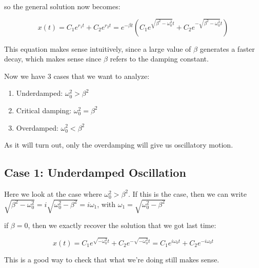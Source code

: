 so the general solution now becomes: 

\[ x(t) = C_1e^{r_1t} + C_2e^{r_2t} = e^{-\beta t} \left( C_1e^{\sqrt{\beta^2 - \omega_0^2} t } + C_2e^{-\sqrt{\beta^2 - \omega_0^2}t}\right)\]

This equation makes sense intuitively, since a large value of $\beta$ generates a faster decay, which makes sense since $\beta$ refers to the damping constant. 

Now we have 3 cases that we want to analyze: 

\begin{enumerate}[label = (\alph*)]
    \item Underdamped: $\omega_0^2 > \beta^2$ 
    \item Critical damping: $\omega_0^2 = \beta^2$
    \item Overdamped: $\omega_0^2 < \beta^2$
\end{enumerate}

As it will turn out, only the overdamping will give us oscillatory motion.

\subsection{Case 1: Underdamped Oscillation} 

Here we look at the case where $\omega_0^2 > \beta^2$. If this is the case, then we can write $\sqrt{\beta^2 - \omega_0^2} = i\sqrt{\omega_0^2 - \beta^2} = i\omega_1$, with $\omega_1 = \sqrt{\omega_0^2 - \beta^2}$

\begin{insight*}{}{}
    if $\beta = 0$, then we exactly recover the solution that we got last time: 

    \[ x(t) = C_1e^{\sqrt{-\omega_0^2}t} + C_2e^{-\sqrt{-\omega_0^2}t} = C_1e^{i\omega_0t} + C_2e^{-i\omega_0t}\]

    This is a good way to check that what we're doing still makes sense.
\end{insight*}




